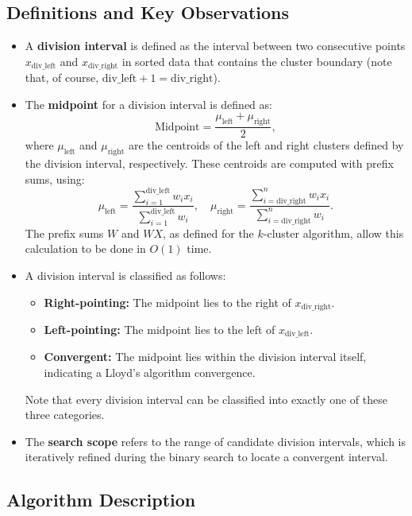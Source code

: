 \subsection{Definitions and Key Observations}

\begin{itemize}
    \item A \textbf{division interval} is defined as the interval between two consecutive points \(x_{\text{div\_left}}\) and \(x_{\text{div\_right}}\) in sorted data that contains the cluster boundary (note that, of course, $\text{div\_left} + 1 = \text{div\_right}$).
    \item The \textbf{midpoint} for a division interval is defined as:
    \[
    \text{Midpoint} = \frac{\mu_{\text{left}} + \mu_{\text{right}}}{2},
    \]
    where \(\mu_{\text{left}}\) and \(\mu_{\text{right}}\) are the centroids of the left and right clusters defined by the division interval, respectively. These centroids are computed with prefix sums, using:
    \[
    \mu_{\text{left}} = \frac{\sum_{i=1}^{\text{div\_left}} w_i x_i}{\sum_{i=1}^{\text{div\_left}} w_i}, \quad 
    \mu_{\text{right}} = \frac{\sum_{i=\text{div\_right}}^n w_i x_i}{\sum_{i=\text{div\_right}}^n w_i}.
    \]
    The prefix sums $W$ and $WX$, as defined for the $k$-cluster algorithm, allow this calculation to be done in $O(1)$ time.
    \item A division interval is classified as follows:
        \begin{itemize}
            \item \textbf{Right-pointing:} The midpoint lies to the right of \(x_{\text{div\_right}}\).
            \item \textbf{Left-pointing:} The midpoint lies to the left of \(x_{\text{div\_left}}\).
            \item \textbf{Convergent:} The midpoint lies within the division interval itself, indicating a Lloyd’s algorithm convergence.
        \end{itemize}
    Note that every division interval can be classified into exactly one of these three categories.

    \item The \textbf{search scope} refers to the range of candidate division intervals, which is iteratively refined during the binary search to locate a convergent interval.
\end{itemize}

\subsection{Algorithm Description}

